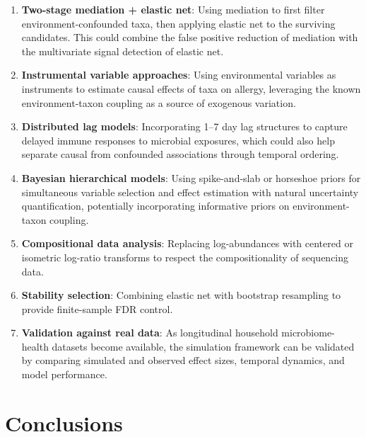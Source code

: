 \documentclass[11pt,letterpaper]{article}
\begin{document}
\begin{enumerate}
    \item \textbf{Two-stage mediation + elastic net}: Using mediation to first filter environment-confounded taxa, then applying elastic net to the surviving candidates. This could combine the false positive reduction of mediation with the multivariate signal detection of elastic net.
    \item \textbf{Instrumental variable approaches}: Using environmental variables as instruments to estimate causal effects of taxa on allergy, leveraging the known environment-taxon coupling as a source of exogenous variation.
    \item \textbf{Distributed lag models}: Incorporating 1--7 day lag structures to capture delayed immune responses to microbial exposures, which could also help separate causal from confounded associations through temporal ordering.
    \item \textbf{Bayesian hierarchical models}: Using spike-and-slab or horseshoe priors for simultaneous variable selection and effect estimation with natural uncertainty quantification, potentially incorporating informative priors on environment-taxon coupling.
    \item \textbf{Compositional data analysis}: Replacing log-abundances with centered or isometric log-ratio transforms to respect the compositionality of sequencing data.
    \item \textbf{Stability selection}: Combining elastic net with bootstrap resampling to provide finite-sample FDR control.
    \item \textbf{Validation against real data}: As longitudinal household microbiome-health datasets become available, the simulation framework can be validated by comparing simulated and observed effect sizes, temporal dynamics, and model performance.
\end{enumerate}

\section{Conclusions}
\end{document}
